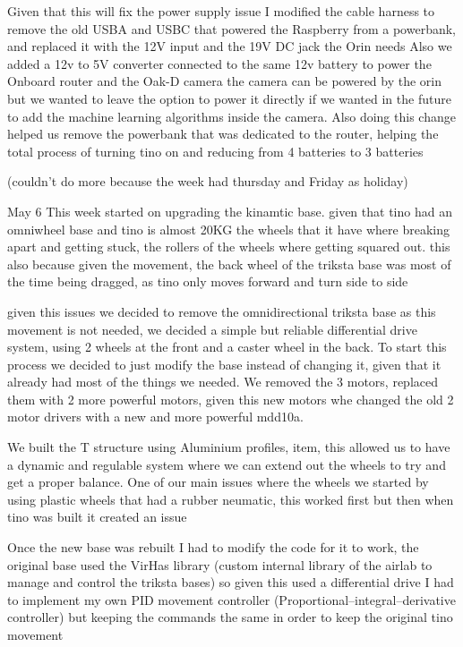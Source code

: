 Given that this will fix the power supply issue I modified the cable harness to remove the old USBA and USBC that powered the Raspberry from a powerbank, and replaced it with the 12V input and the 19V DC jack the Orin needs
Also we added a 12v to 5V converter connected to the same 12v battery to power the Onboard router and the Oak-D camera
the camera can be powered by the orin but we wanted to leave the option to power it directly if we wanted in the future to add the machine learning algorithms inside the camera.
Also doing this change helped us remove the powerbank that was dedicated to the router, helping the total process of turning tino on and reducing from 4 batteries to 3 batteries


(couldn't do more because the week had thursday and Friday as holiday)

May 6
This week started on upgrading the kinamtic base. given that tino had an omniwheel base and tino is almost 20KG the wheels that it have where breaking apart and getting stuck, the rollers of the wheels where getting squared out. this also because given the movement, the back wheel of the triksta base was most of the time being dragged, as tino only moves forward and turn side to side

given this issues we decided to remove the omnidirectional triksta base as this movement is not needed, we decided a simple but reliable differential drive system, using 2 wheels at the front and a caster wheel in the back. To start this process we decided to just modify the base instead of changing it, given that it already had most of the things we needed.
We removed the 3 motors, replaced them with 2 more powerful motors, given this new motors whe changed the old 2 motor drivers with a new and more powerful mdd10a.

We built the T structure using Aluminium profiles, item, this allowed us to have a dynamic and regulable system where we can extend out the wheels to try and get a proper balance.
One of our main issues where the wheels we started by using plastic wheels that had a rubber neumatic, this worked first but then when tino was built it created an issue

Once the new base was rebuilt I had to modify the code for it to work, the original base used the VirHas library (custom internal library of the airlab to manage and control the triksta bases) so given this used a differential drive I had to implement my own PID movement controller (Proportional–integral–derivative controller) but keeping the commands the same in order to keep the original tino movement


